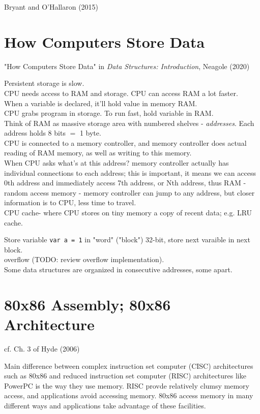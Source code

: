 \documentclass[10pt]{amsart}
\begin{document}
Bryant and O'Hallaron (2015) \cite{BrOH2016}

\section{How Computers Store Data}

"How Computers Store Data" in \emph{Data Structures: Introduction}, Neagole (2020) \cite{Neag2020}

Persistent storage is slow. \\
CPU needs access to RAM and storage. CPU can access RAM a lot faster. \\
When a variable is declared, it'll hold value in memory RAM. \\
CPU grabs program in storage. To run fast, hold variable in RAM. \\ 
Think of RAM as massive storage area with numbered shelves - \emph{addresses}. Each address holds 8 bits $=$ 1 byte. \\
CPU is connected to a memory controller, and memory controller does actual reading of RAM memory, as well as writing to this memory. \\
When CPU asks what's at this address? memory controller actually has individual connections to each address; this is important, it means we can access 0th address and immediately access 7th address, or Nth address, thus RAM - random access memory - memory controller can jump to any address, but closer information is to CPU, less time to travel. \\
CPU cache- where CPU stores on tiny memory a copy of recent data; e.g. LRU cache.

Store variable \verb|var a = 1| in "word" ("block") 32-bit, store next varaible in next block. \\
overflow (TODO: review overflow implementation). \\
Some data structures are organized in consecutive addresses, some apart.


\section{80x86 Assembly; 80x86 Architecture}  

cf. Ch. 3 of Hyde (2006) \cite{Hyde2006}

Main difference between complex instruction set computer (CISC) architectures such as 80x86 and reduced instruction set computer (RISC) architectures like PowerPC is the way they use memory.  RISC provde relatively clumsy memory access, and applications avoid accessing memory.  80x86 access memory in many different ways and applications take advantage of these facilities.  
\end{document}
